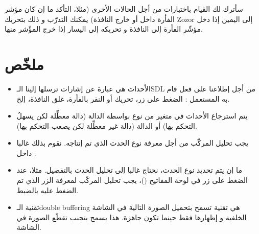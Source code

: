 سأترك لك القيام باختبارات من أجل الحالات الأخرى (مثلا، التأكد ما إن كان مؤشر الفأرة داخل أو خارج النافذة) يمكنك التدرّب و ذلك بتحريك
\textenglish{Zozor}
إلى اليمين إذا دخل مؤشّر الفأرة إلى النافذة و تحريكه إلى اليسار إذا خرج المؤّشر منها.

\section*{ملخّص}

\begin{itemize}
	\item الأحداث هي عبارة عن إشارات ترسلها إلينا الـ\textenglish{SDL}
	من أجل إطلاعنا على فعل قام به المستعمل : الضغط على زر، تحريك أو النقر بالفأرة، غلق النافذة، إلخ.
	\item يتم استرجاع الأحداث في متغير من نوع
	بواسطة الدالة
	(دالة معطِّلة لكن يسهلُ التحكم بها) أو الدالة 
	(دالة غير معطِّلة لكن يصعب التحكم بها).
	\item يجب تحليل المركّب
	من أجل معرفة نوع الحدث الذي تم إنتاجه. نقوم بذلك غالبا داخل 
	.
	\item ما إن يتم تحديد نوع الحدث، نحتاج غالبا إلى تحليل الحدث بالتفصيل. مثلا، عند الضغط على زر في لوحة المفاتيح
	()،
	يجب تحليل المركّب
	لمعرفة الزر الذي تم الضغط عليه بالضبط.
	\item تقنية الـ\textenglish{double buffering}
	هي تقنية تسمح بتحميل الصورة التالية في الشاشة الخلفية و إظهارها فقط حينما تكون جاهزة. هذا يسمح بتجنب تقطّع الصورة في الشاشة.
\end{itemize}

